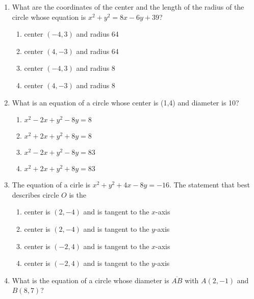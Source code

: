 \documentclass[12pt, twoside]{article}
\begin{document}
\begin{enumerate}
\newpage
  


  \item %
  What are the coordinates of the center and the length of the radius of the circle whose equation is $x^2+y^2=8x-6y+39$?
    \begin{enumerate}
      \item center $(-4,3)$ and radius 64
      \item center $(4,-3)$ and radius 64
      \item center $(-4,3)$ and radius 8
      \item center $(4,-3)$ and radius 8
    \end{enumerate}

\item %
What is an equation of a circle whose center is (1,4) and diameter is 10?
  \begin{enumerate}
    \item $x^2-2x+y^2-8y=8$
    \item $x^2+2x+y^2+8y=8$
    \item $x^2-2x+y^2-8y=83$
    \item $x^2+2x+y^2+8y=83$
  \end{enumerate}    
     
  \item %
  The equation of a cirle is $x^2+y^2+4x-8y=-16$. The statement that best describes circle $O$ is the
    \begin{enumerate}
      \item center is $(2,-4)$ and is tangent to the $x$-axis
      \item center is $(2,-4)$ and is tangent to the $y$-axis
      \item center is $(-2,4)$ and is tangent to the $x$-axis
      \item center is $(-2,4)$ and is tangent to the $y$-axis
    \end{enumerate}

  \item What is the equation of a circle whose diameter is $\overline{AB}$ with $A(2,-1)$ and $B(8,7)$?
    \begin{flushright}
    \end{flushright}


\end{enumerate}
\end{document}
